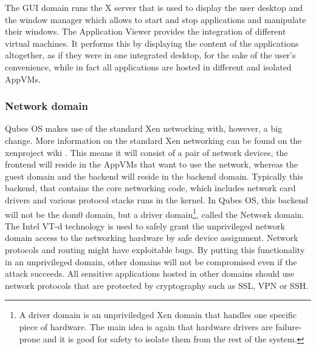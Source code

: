 \documentclass[runningheads,a4paper]{article}
\begin{document}
The GUI domain runs the X server that is used to display the user desktop and
the window manager which allows to start and stop applications and
manipulate their windows. The Application Viewer provides the
integration of different virtual machines. It performs this by displaying the
content of the applications altogether, as if they were in one integrated desktop, for
the sake of the user's convenience, while in fact all applications are hosted in different and isolated AppVMs.


\subsubsection{Network domain}

Qubes OS makes use of the standard Xen networking with, however, a big
change. More information on the standard Xen networking can be found
on the xenproject wiki \cite{XenNetworking}. This means it will
consist of a pair of network devices, the frontend will reside in the
AppVMs that want to use the network, whereas the guest domain and the
backend will reside in the backend domain. Typically this backend,
that contains the core networking code, which includes network card
drivers and various protocol stacks runs in the kernel. In Qubes OS,
this backend will not be the dom0 domain, but a driver
domain\footnote{A driver domain is an unpriviledged Xen domain that
handles one specific piece of hardware. The main idea is again that
hardware drivers are failure-prone and it is good for safety to
isolate them from the rest of the system.}, called the Network
domain. The Intel VT-d technology is used to safely grant the
unprivileged network domain access to the networking hardware by safe
device assignment. Network protocols and routing might have
exploitable bugs. By putting this functionality in an unprivileged
domain, other domains will not be compromised even if the attack
succeeds. All sensitive applications hosted in other domains should
use network protocols that are protected by cryptography such as SSL,
VPN or SSH.
\end{document}
